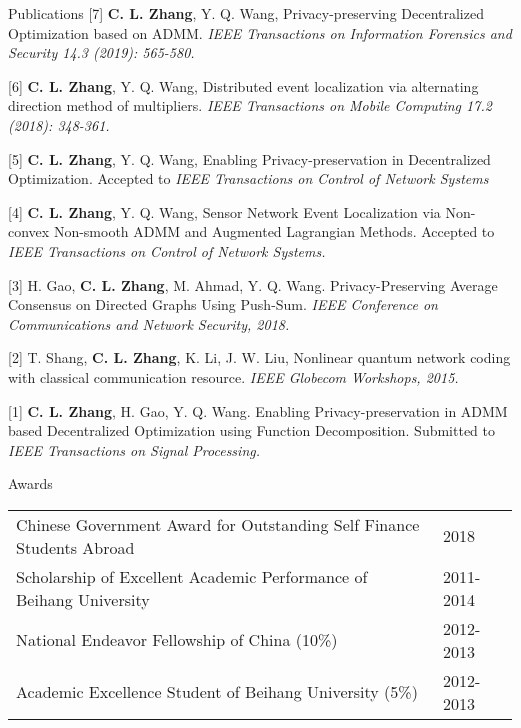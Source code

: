 \documentclass{resume} %
\begin{document}
\vspace{3cm}
\begin{rSection}{Publications}	
	[7] \textbf{C. L. Zhang}, Y. Q. Wang, Privacy-preserving Decentralized Optimization based on ADMM. \emph{IEEE Transactions on Information Forensics and Security 14.3 (2019): 565-580.}
	
	[6]	\textbf{C. L. Zhang}, Y. Q. Wang, Distributed event localization via alternating direction method of multipliers. \emph{IEEE Transactions on Mobile Computing 17.2 (2018): 348-361.}
	
	[5] \textbf{C. L. Zhang}, Y. Q. Wang, Enabling Privacy-preservation in Decentralized Optimization.  Accepted to \emph{IEEE Transactions on Control of Network Systems}
		
	[4] \textbf{C. L. Zhang}, Y. Q. Wang, Sensor Network Event Localization via Non-convex Non-smooth ADMM and Augmented Lagrangian Methods. Accepted to  \emph{IEEE Transactions on Control of Network Systems.}
	
	[3] H. Gao, \textbf{C. L. Zhang}, M. Ahmad, Y. Q. Wang. Privacy-Preserving Average Consensus on Directed Graphs Using Push-Sum.  \emph{IEEE Conference on Communications and Network Security, 2018.}
	
	[2] T. Shang, \textbf{C. L. Zhang}, K. Li, J. W. Liu, Nonlinear quantum network coding with classical
	communication resource.  \emph{IEEE Globecom Workshops, 2015.}
	
	[1] \textbf{C. L. Zhang}, H. Gao,  Y. Q. Wang. Enabling Privacy-preservation in ADMM based Decentralized Optimization using Function Decomposition. Submitted to \emph{IEEE Transactions on Signal Processing.}
\end{rSection}


\begin{rSection}{Awards}
\begin{tabular}{ @{} >{}l @{\hspace{23ex}} l }
Chinese Government Award for Outstanding Self Finance Students Abroad  & 2018 \\
Scholarship of Excellent Academic Performance of Beihang University & 2011-2014  \\
National Endeavor Fellowship of China (10\%) & 2012-2013\\
Academic Excellence Student of Beihang University (5\%) & 2012-2013
\end{tabular}\\
\end{rSection}
\end{document}

